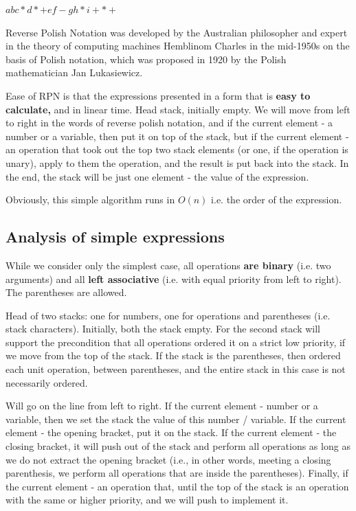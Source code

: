 $a b c * d * + e f - g h * i + * +$

Reverse Polish Notation was developed by the Australian philosopher and expert in the theory of computing machines Hemblinom Charles in the mid-1950s on the basis of Polish notation, which was proposed in 1920 by the Polish mathematician Jan Lukasiewicz.

Ease of RPN is that the expressions presented in a form that is \textbf{easy to calculate,} and in linear time. Head stack, initially empty. We will move from left to right in the words of reverse polish notation, and if the current element - a number or a variable, then put it on top of the stack, but if the current element - an operation that took out the top two stack elements (or one, if the operation is unary), apply to them the operation, and the result is put back into the stack. In the end, the stack will be just one element - the value of the expression.

Obviously, this simple algorithm runs in $O (n)$ i.e. the order of the expression.

\subsection{ Analysis of simple expressions }

While we consider only the simplest case, all operations \textbf{are binary} (i.e. two arguments) and all \textbf{left associative} (i.e. with equal priority from left to right). The parentheses are allowed.

Head of two stacks: one for numbers, one for operations and parentheses (i.e. stack characters). Initially, both the stack empty. For the second stack will support the precondition that all operations ordered it on a strict low priority, if we move from the top of the stack. If the stack is the parentheses, then ordered each unit operation, between parentheses, and the entire stack in this case is not necessarily ordered.

Will go on the line from left to right. If the current element - number or a variable, then we set the stack the value of this number / variable. If the current element - the opening bracket, put it on the stack. If the current element - the closing bracket, it will push out of the stack and perform all operations as long as we do not extract the opening bracket (i.e., in other words, meeting a closing parenthesis, we perform all operations that are inside the parentheses). Finally, if the current element - an operation that, until the top of the stack is an operation with the same or higher priority, and we will push to implement it.

